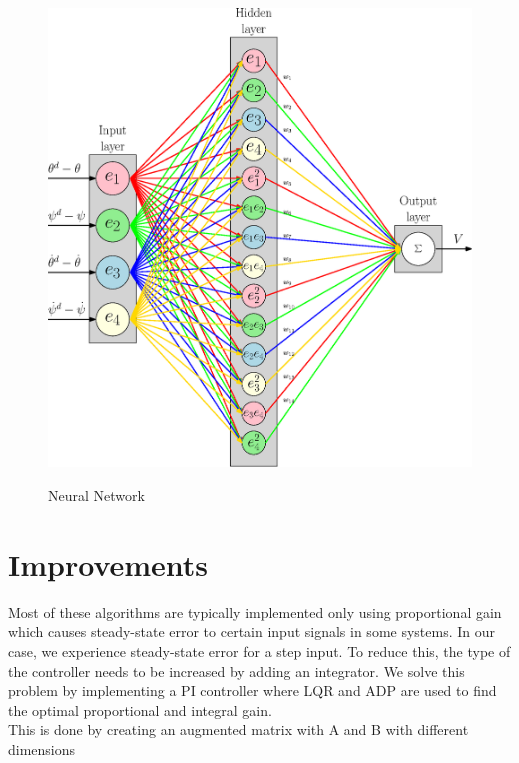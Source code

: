 \begin{figure}[!htbp]
    \centering
    \includegraphics[width=.46\textwidth,keepaspectratio=true]{figs/ipe/ADP_Neural_Network.eps}
    \label{fig:NeuralNetwork}
    \caption{Neural Network}
\end{figure}

\section{Improvements}
Most of these algorithms are typically implemented only using proportional gain which causes steady-state error to certain input signals in some systems.  In our case, we experience steady-state error for a step input.  To reduce this, the type of the controller needs to be increased by adding an integrator.  We solve this problem by implementing a PI controller where LQR and ADP are used to find the optimal proportional and integral gain.\\
This is done by creating an augmented matrix with A and B with different dimensions




